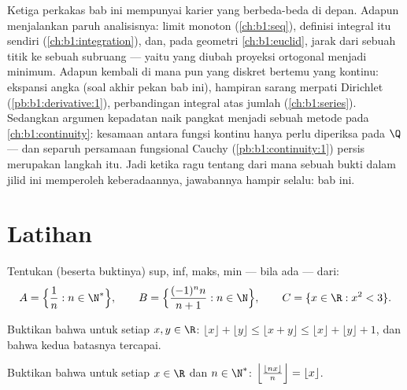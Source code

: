 \begin{remark}
Ketiga perkakas bab ini mempunyai karier yang berbeda-beda di depan. Adapun
 menjalankan paruh analisisnya: limit monoton
(\cref{ch:b1:seq}), definisi integral itu sendiri
(\cref{ch:b1:integration}), dan, pada geometri
\cref{ch:b1:euclid}, jarak dari sebuah titik ke sebuah subruang ---
yaitu  yang diubah proyeksi ortogonal menjadi minimum. Adapun
 kembali di mana pun yang diskret bertemu yang
kontinu: ekspansi angka (soal akhir pekan bab ini),
hampiran sarang merpati Dirichlet
(\cref{pb:b1:derivative:1}), perbandingan integral atas jumlah
(\cref{ch:b1:series}). Sedangkan argumen kepadatan naik pangkat menjadi sebuah metode
pada \cref{ch:b1:continuity}: kesamaan antara fungsi kontinu
hanya perlu diperiksa pada $\Q$ --- dan separuh persamaan fungsional
Cauchy (\cref{pb:b1:continuity:1}) persis merupakan langkah itu. Jadi ketika
ragu tentang dari mana sebuah bukti dalam jilid ini memperoleh 
keberadaannya, jawabannya hampir selalu: bab ini.
\end{remark}

\section{Latihan}

\begin{exercise}[$\star$]\label{exo:b1:reals:1}
Tentukan (beserta buktinya) sup, inf, maks, min --- bila ada --- dari:
\[
A = \Bigl\{\frac{1}{n} : n \in \N^*\Bigr\},
\qquad
B = \Bigl\{\frac{(-1)^n n}{n+1} : n \in \N\Bigr\},
\qquad
C = \{x \in \R : x^2 < 3\}.
\]
\end{exercise}

\begin{exercise}[$\star$]\label{exo:b1:reals:2}
Buktikan bahwa untuk setiap $x, y \in \R$: $\lfloor x \rfloor + \lfloor y
\rfloor \leq \lfloor x + y \rfloor \leq \lfloor x \rfloor + \lfloor y
\rfloor + 1$, dan bahwa kedua batasnya tercapai.
\end{exercise}

\begin{exercise}[$\star$]\label{exo:b1:reals:3}
Buktikan bahwa untuk setiap $x \in \R$ dan $n \in \N^*$:
$\Bigl\lfloor \frac{\lfloor nx \rfloor}{n} \Bigr\rfloor = \lfloor x
\rfloor$.
\end{exercise}

